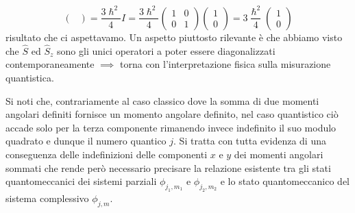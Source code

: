 \[\begin{pmatrix}
                                                    \end{pmatrix} = \frac{3 \hslash^{2}}{4} I = \frac{3\hslash^{2}}{4} \begin{pmatrix}
                                                                                                                           1 & 0 \\
                                                                                                                           0 & 1
                                                    \end{pmatrix}\begin{pmatrix}
                                                                     1 \\
                                                                     0
                                                    \end{pmatrix}
                                                    = 3 \frac{\hslash^{2}}{4} \begin{pmatrix}
                                                                                  1 \\
                                                                                  0
                                                    \end{pmatrix}
\] risultato che ci aspettavamo.
Un aspetto piuttosto rilevante è che
abbiamo visto che \(\hat{S}\) ed \(\hat{S}_{z}\) sono gli unici
operatori a poter essere diagonalizzati contemporaneamente \(\implies\)
torna con l'interpretazione fisica sulla misurazione quantistica.

Si noti che, contrariamente al caso classico dove la somma di due
momenti angolari definiti fornisce un momento angolare definito, nel
caso quantistico ciò accade solo per la terza componente rimanendo
invece indefinito il suo modulo quadrato e dunque il numero quantico
\(j\).
Si tratta con tutta evidenza di una conseguenza delle
indefinizioni delle componenti \(x\) e \(y\) dei momenti angolari
sommati che rende però necessario precisare la relazione esistente tra
gli stati quantomeccanici dei sistemi parziali \(\phi_{j_1, m_1}\) e
\(\phi_{j_2,m_2}\) e lo stato quantomeccanico del sistema complessivo
\(\phi_{j,m}\).

